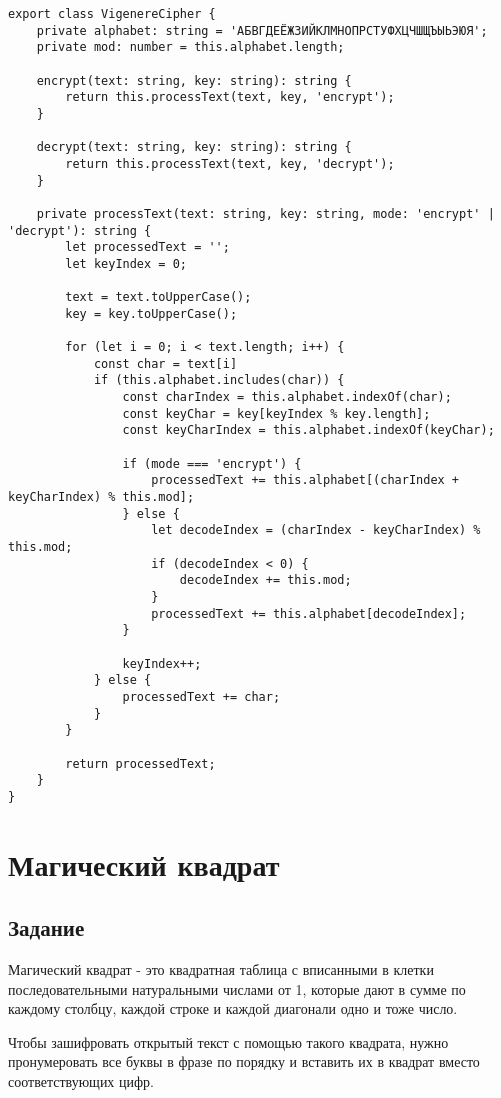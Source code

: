 \begin{lstlisting}[caption={Шифр многоалфавитной замены Вижинера}, label=lst:1]
export class VigenereCipher {
	private alphabet: string = 'АБВГДЕЁЖЗИЙКЛМНОПРСТУФХЦЧШЩЪЫЬЭЮЯ';
	private mod: number = this.alphabet.length;
	
	encrypt(text: string, key: string): string {
		return this.processText(text, key, 'encrypt');
	}
	
	decrypt(text: string, key: string): string {
		return this.processText(text, key, 'decrypt');
	}
	
	private processText(text: string, key: string, mode: 'encrypt' | 'decrypt'): string {
		let processedText = '';
		let keyIndex = 0;
		
		text = text.toUpperCase();
		key = key.toUpperCase();
		
		for (let i = 0; i < text.length; i++) {
			const char = text[i]
			if (this.alphabet.includes(char)) {
				const charIndex = this.alphabet.indexOf(char);
				const keyChar = key[keyIndex % key.length];
				const keyCharIndex = this.alphabet.indexOf(keyChar);
				
				if (mode === 'encrypt') {
					processedText += this.alphabet[(charIndex + keyCharIndex) % this.mod];
				} else {
					let decodeIndex = (charIndex - keyCharIndex) % this.mod;
					if (decodeIndex < 0) {
						decodeIndex += this.mod;
					}
					processedText += this.alphabet[decodeIndex];
				}
				
				keyIndex++;
			} else {
				processedText += char;
			}
		}
		
		return processedText;
	}
}

\end{lstlisting}

\section{Магический квадрат}

\subsection{Задание}

Магический квадрат - это квадратная таблица с вписанными в клетки последовательными натуральными числами от 1, которые дают в сумме по каждому столбцу, каждой строке и каждой диагонали одно и тоже число.

Чтобы зашифровать открытый текст с помощью такого квадрата, нужно пронумеровать все буквы в фразе по порядку и вставить их в квадрат вместо соответствующих цифр.

